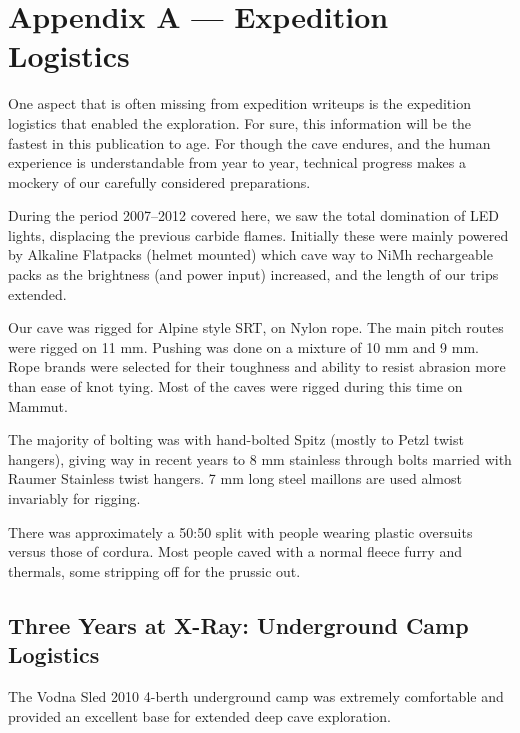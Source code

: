 \hypertarget{appendix-a-expedition-logistics}{%
\chapter{Appendix A --- Expedition
Logistics}\label{appendix-a-expedition-logistics}}

One aspect that is often missing from expedition writeups is the
expedition logistics that enabled the exploration. For sure, this
information will be the fastest in this publication to age. For though
the cave endures, and the human experience is understandable from year
to year, technical progress makes a mockery of our carefully considered
preparations.

During the period 2007--2012 covered here, we saw the total domination
of LED lights, displacing the previous carbide flames. Initially these
were mainly powered by Alkaline Flatpacks (helmet mounted) which cave
way to NiMh rechargeable packs as the brightness (and power input)
increased, and the length of our trips extended.

Our cave was rigged for Alpine style SRT, on Nylon rope. The main pitch
routes were rigged on 11 mm. Pushing was done on a mixture of 10 mm and
9 mm. Rope brands were selected for their toughness and ability to
resist abrasion more than ease of knot tying. Most of the caves were
rigged during this time on Mammut.

The majority of bolting was with hand-bolted Spitz (mostly to Petzl
twist hangers), giving way in recent years to 8 mm stainless through
bolts married with Raumer Stainless twist hangers. 7 mm long steel
maillons are used almost invariably for rigging.

There was approximately a 50:50 split with people wearing plastic
oversuits versus those of cordura. Most people caved with a normal
fleece furry and thermals, some stripping off for the prussic out.


\hypertarget{three-years-at-x-ray-underground-camp-logistics}{%
\section{Three Years at X-Ray: Underground Camp
Logistics}\label{three-years-at-x-ray-underground-camp-logistics}}

The Vodna Sled 2010 4-berth underground camp was extremely comfortable
and provided an excellent base for extended deep cave exploration.

